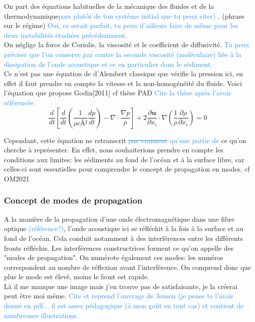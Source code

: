\documentclass{rapportECC}
\newcommand{\FAadd}[1]{\textcolor{DodgerBlue}{{#1}}}                     %
\newcommand{\FAdel}[1]{\textcolor{DodgerBlue}{\sout{#1}}}                %
\begin{document}
On part des équations habituelles de la mécanique des fluides et de la thermodynamique\FAadd{pars plutôt de ton système initial que tu peux citer)} . (phrase sur le régime) \FAadd{Oui, ce serait parfait, tu peux d'ailleurs faire de même pour les deux instabilités étudiées précédemment.}
\\
On néglige la force de Coriolis, la viscosité et le coefficient de diffusivité. \FAadd{Tu peux préciser que l'on conserve par contre la seconde viscosité (moléculaire) liée à la dissipation de l'onde acoustique et ce en particulier dans le sédiment.}
\\
Ce n'est pas une équation de d'Alembert classique que vérifie la pression ici, en effet il faut prendre en compte la vitesse et la non-homogénéité du fluide. Voici l'équation que propose Godin[2011] cf thèse PAD \FAadd{Cite la thèse après l'avoir référencée.}
\begin{equation}
    \frac{d}{dt}[\frac{d}{dt}(\frac{1}{\rho cÂ²}\frac{dp}{dt}) - \nabla \cdot \frac{\nabla p}{\rho}] + 2\frac{\partial \mathbf{u}}{\partial x_i} \cdot \nabla (\frac{1}{\rho}\frac{\partial \rho}{\partial x_i}) = 0
\end{equation}

Cependant, cette équation ne retranscrit \FAdel{pas vraiment} \FAadd{ qu'une partie de} ce qu'on cherche à représenter. En effet, nous souhaiterions prendre en compte les conditions aux limites: les sédiments au fond de l'océan et à la surface libre, car celles-ci sont essentielles pour comprendre le concept de propagation en modes. cf OM2021

\subsubsection{Concept de modes de propagation}

A la manière de la propagation d'une onde électromagnétique dans une fibre optique \FAadd{(référence?)}, l'onde acoustique ici se réfléchit à la fois à la surface et au fond de l'océan. Cela conduit notamment à des interférences entre les différents fronts réfléchis. Les interférences constructrices forment ce qu'on appelle des "modes de propagation". On numérote également ces modes: les numéros correspondent au nombre de réflexion avant l'interférence. On comprend donc que plus le mode est élevé, moins le front est rapide. \\
Là il me manque une image mais j'en trouve pas de satisfaisante, je la créerai peut être moi même. \FAadd{ Cite et reprend l'ouvrage de Jensen (je pense te l'avoir donné en pdf... il est assez pédagogique (à mon goût en tout cas) et contient de nombreuses illustrations.}
\\
\end{document}
